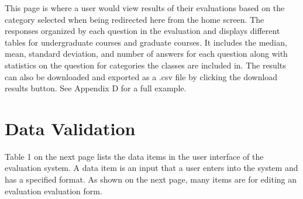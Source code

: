 \documentclass{article}
\begin{document}
This page is where a user would view results of their evaluations based on the category selected when being redirected here from the home screen.  The responses organized by each question in the evaluation and displays different tables for undergraduate courses and graduate courses. It includes the median, mean, standard deviation, and number of answers for each question along with statistics on the question for categories the classes are included in. The results can also be downloaded and exported as a .csv file by clicking the download results button. See Appendix D for a full example.

\section{Data Validation}

Table 1 on the next page lists the data items in the user interface of the evaluation system. A data item is an input that a user enters into the system and has a specified format. As shown on the next page, many items are for editing an evaluation evaluation form.
\end{document}
